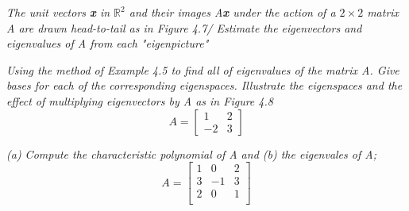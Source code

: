 \documentclass[12pt,letterpaper]{hmcpset}
\begin{document}


\begin{problem}[4.1.20]
\textit{The unit vectors \textbf{x} in $\mathbb{R}^2$ and their images A\textbf{x} under the action of a $2\times 2$ matrix A are drawn head-to-tail as in Figure 4.7/ Estimate the eigenvectors and eigenvalues of A from each "eigenpicture"}
\end{problem}




\begin{solution}

\end{solution}

\newpage



\begin{problem}[4.1.26]
\textit{Using the method of Example 4.5 to find all of eigenvalues of the matrix A. Give bases for each of the corresponding eigenspaces. Illustrate the eigenspaces and the effect of multiplying eigenvectors by A as in Figure 4.8}
$$ A = \begin{bmatrix}
1&2\\-2&3
\end{bmatrix}
$$
\end{problem}

\begin{solution}
\end{solution}

\newpage



\begin{problem}[4.3.6 ]
\textit{(a) Compute the characteristic polynomial of A and (b) the eigenvales of A;}
$$
A = \begin{bmatrix}
1&0&2\\
3&-1&3\\
2&0&1\\
\end{bmatrix}
$$
\end{problem}

\begin{solution}
\end{solution}

\newpage

\end{document}
